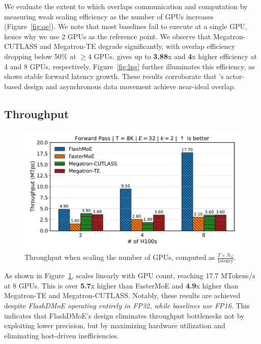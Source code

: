 We evaluate the extent to which \sysname overlaps communication and computation by measuring weak scaling efficiency
as the number of GPUs increases (Figure~\ref{fig:oe}).
We note that most baselines fail to execute at a single GPU, hence why we use 2 GPUs as the reference point.
We observe that Megatron-CUTLASS and Megatron-TE degrade significantly,
with overlap efficiency dropping below 50\% at $\geq 4$ GPUs. \sysname gives up to \textbf{3.88}x and
\textbf{4}x higher efficiency at 4 and 8 GPUs, respectively.
Figure~\ref{fig:lng} further illuminates this efficiency, as \sysname shows stable forward latency growth.
These results corroborate that \sysname's actor-based design and asynchronous data movement
achieve near-ideal overlap.
\subsection{Throughput}\label{subsec:throughput}
\begin{figure}
    \vspace{-15pt}
    \centering
    \includegraphics[width=0.9\linewidth, keepaspectratio]{flash_figs/throughput_8}
    \caption{Throughput when scaling the number of GPUs, computed as $\frac{T \times N_G}{\text{latency}}$.}
    \label{fig:thr}
\end{figure}
As shown in Figure~\ref{fig:thr}, \sysname scales linearly with GPU count, reaching 17.7 MTokens/s at 8 GPUs.
This is over \textbf{5.7}x higher than FasterMoE and \textbf{4.9}x higher than Megatron-TE and Megatron-CUTLASS\@.
Notably, these results are achieved despite \emph{FlashDMoE operating entirely in FP32,
while baselines use FP16}.
This indicates that FlashDMoE’s design eliminates throughput bottlenecks not by
exploiting lower precision, but by maximizing hardware utilization and eliminating host-driven inefficiencies.
